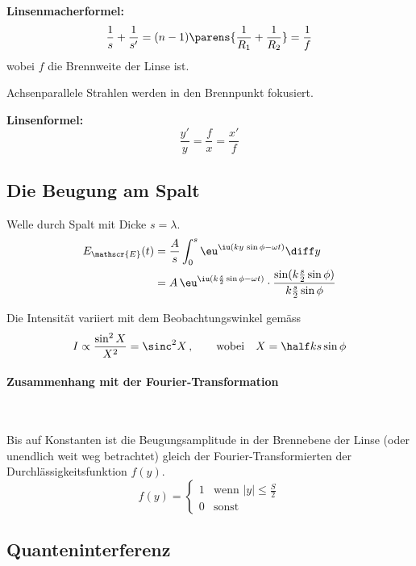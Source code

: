 			\begin{center}
				
			\end{center}
			
			\textbf{Linsenmacherformel:}
			\[
				\frac 1 s + \frac 1 {s'} = (n-1) \parens{\frac{1}{R_1} + \frac{1}{R_2}} = \frac 1 f
			\]
			wobei $f$ die Brennweite der Linse ist.
			
			Achsenparallele Strahlen werden in den Brennpunkt fokusiert.
			
			\textbf{Linsenformel:}
			\[
				\frac{y'}{y} = \frac f x = \frac{x'}{f}
			\]
	\subsection{Die Beugung am Spalt} %
		Welle durch Spalt mit Dicke $s=\lambda$.
		\begin{align*}
			E_\mathscr{E}(t) &= \frac A s \int_0^s \eu^{\iu(ky \,\sin \phi - \omega t)} \diff y \\
			&= A \,\eu^{\iu(k \frac s 2 \sin \phi - \omega t)} \cdot \frac{\sin(k \frac s 2 \sin \phi)}{k \frac s 2 \sin \phi}
		\end{align*}
		
		Die Intensität variiert mit dem Beobachtungswinkel gemäss
		\[
			I \propto \frac{\sin^2 X}{X^2} = \sinc^2 X \,,\qquad
				\text{wobei} \quad X = \half k s \sin \phi
		\]
		
		\begin{center}
			
		\end{center}
		
		\paragraph{Zusammenhang mit der Fourier-Transformation} %
			~
			
			Bis auf Konstanten ist die Beugungsamplitude in der Brennebene der Linse (oder unendlich weit weg betrachtet) gleich der Fourier-Transformierten der Durchlässigkeitsfunktion $f(y)$.
			\[
				f(y) = \left\{\begin{array}{rl}
					1 & \text{wenn } |y| \le \frac S 2 \\
					0 & \text{sonst}
				\end{array}\right.
			\]
	\subsection{Quanteninterferenz} %
